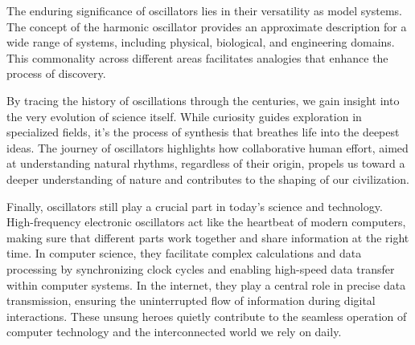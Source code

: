The enduring significance of oscillators lies in their versatility as model systems. The concept of the harmonic oscillator provides an approximate description for a wide range of systems, including physical, biological, and engineering domains. This commonality across different areas facilitates analogies that enhance the process of discovery.

By tracing the history of oscillations through the centuries, we gain insight into the very evolution of science itself. While curiosity guides exploration in specialized fields, it's the process of synthesis that breathes life into the deepest ideas. The journey of oscillators highlights how collaborative human effort, aimed at understanding natural rhythms, regardless of their origin, propels us toward a deeper understanding of nature and contributes to the shaping of our civilization.

Finally, oscillators still play a crucial part in today's science and technology. High-frequency electronic oscillators act like the heartbeat of modern computers, making sure that different parts work together and share information at the right time. In computer science, they facilitate complex calculations and data processing by synchronizing clock cycles and enabling high-speed data transfer within computer systems. In the internet, they play a central role in precise data transmission, ensuring the uninterrupted flow of information during digital interactions. These unsung heroes quietly contribute to the seamless operation of computer technology and the interconnected world we rely on daily.
